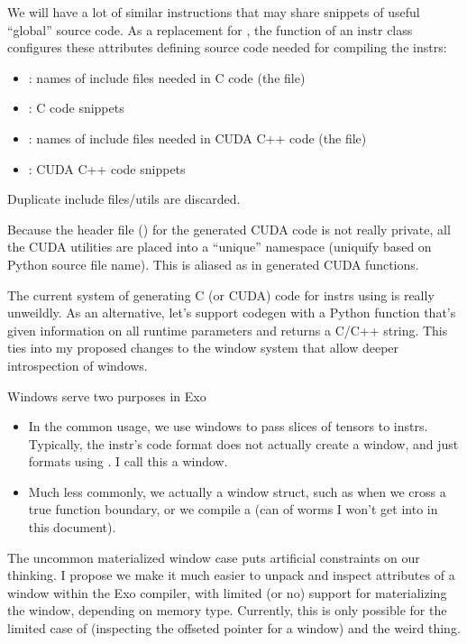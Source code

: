 \filbreak
{}

We will have a lot of similar instructions that may share snippets of useful ``global'' source code.
As a replacement for , the  function of an instr class configures these attributes defining source code needed for compiling the instrs:
\begin{itemize}
\item {}: names of include files needed in C code (the  file)
\item {}: C code snippets
\item {}: names of include files needed in CUDA C++ code (the  file)
\item {}: CUDA C++ code snippets
\end{itemize}
Duplicate include files/utils are discarded.

\filbreak
Because the header file () for the generated CUDA code is not really private, all the CUDA utilities are placed into a ``unique'' namespace (uniquify based on Python source file name).
This is aliased as  in generated CUDA functions.

\filbreak
{}

The current system of generating C (or CUDA) code for instrs using  is really unweildly.
As an alternative, let's support codegen with a Python function that's given information on all runtime parameters and returns a C/C++ string.
This ties into my proposed changes to the window system that allow deeper introspection of windows.

\newpage
{}

Windows serve two purposes in Exo
\begin{itemize}
 \item In the common usage, we use windows to pass slices of tensors to instrs.
 Typically, the instr's code format does not actually create a window, and just formats using .
 I call this a  window.
 \item Much less commonly, we actually  a window struct, such as when we cross a true function boundary, or we compile a  (can of worms I won't get into in this document).
\end{itemize}
\filbreak
The uncommon materialized window case puts artificial constraints on our thinking.
I propose we make it much easier to unpack and inspect attributes of a window within the Exo compiler, with limited (or no) support for materializing the window, depending on memory type.
Currently, this is only possible for the limited case of  (inspecting the offseted pointer for a window) and the weird  thing.

